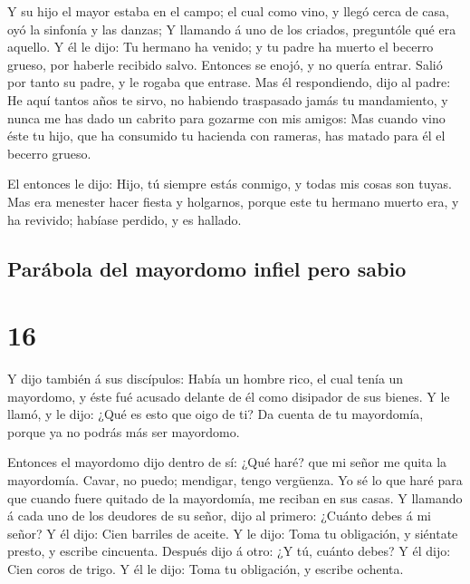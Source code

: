  Y su hijo el mayor estaba en el campo; el cual como
vino, y llegó cerca de casa, oyó la sinfonía y las danzas;
 Y llamando á uno de los criados, preguntóle qué era
aquello.  Y él le dijo: Tu hermano ha venido; y tu padre
ha muerto el becerro grueso, por haberle recibido salvo. 
Entonces se enojó, y no quería entrar. Salió por tanto su padre, y le
rogaba que entrase.  Mas él respondiendo, dijo al padre:
He aquí tantos años te sirvo, no habiendo traspasado jamás tu
mandamiento, y nunca me has dado un cabrito para gozarme con mis amigos:
 Mas cuando vino éste tu hijo, que ha consumido tu
hacienda con rameras, has matado para él el becerro grueso.

 El entonces le dijo: Hijo, tú siempre estás conmigo, y
todas mis cosas son tuyas.  Mas era menester hacer fiesta
y holgarnos, porque este tu hermano muerto era, y ha revivido; habíase
perdido, y es hallado.

\hypertarget{paruxe1bola-del-mayordomo-infiel-pero-sabio}{%
\subsection{Parábola del mayordomo infiel pero
sabio}\label{paruxe1bola-del-mayordomo-infiel-pero-sabio}}

\hypertarget{section-42-16}{%
\section{16}\label{section-42-16}}

 Y dijo también á sus discípulos: Había un hombre rico, el
cual tenía un mayordomo, y éste fué acusado delante de él como disipador
de sus bienes.  Y le llamó, y le dijo: ¿Qué es esto que
oigo de ti? Da cuenta de tu mayordomía, porque ya no podrás más ser
mayordomo.

 Entonces el mayordomo dijo dentro de sí: ¿Qué haré? que
mi señor me quita la mayordomía. Cavar, no puedo; mendigar, tengo
vergüenza.  Yo sé lo que haré para que cuando fuere
quitado de la mayordomía, me reciban en sus casas.  Y
llamando á cada uno de los deudores de su señor, dijo al primero:
¿Cuánto debes á mi señor?  Y él dijo: Cien barriles de
aceite. Y le dijo: Toma tu obligación, y siéntate presto, y escribe
cincuenta.  Después dijo á otro: ¿Y tú, cuánto debes? Y él
dijo: Cien coros de trigo. Y él le dijo: Toma tu obligación, y escribe
ochenta.

